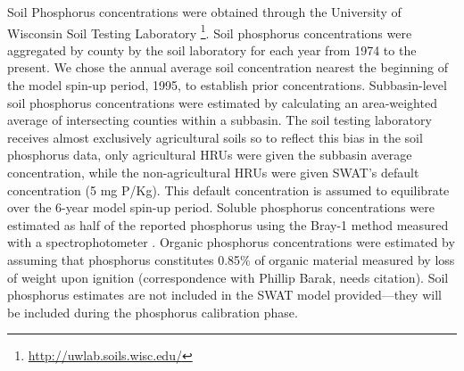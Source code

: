Soil Phosphorus concentrations were obtained through the University of Wisconsin
Soil Testing Laboratory \footnote{\url{http://uwlab.soils.wisc.edu/}}. Soil
phosphorus concentrations were aggregated by county by the soil laboratory for
each year from 1974 to the present. We chose the annual average soil
concentration nearest the beginning of the model spin-up period, 1995, to
establish prior concentrations. Subbasin-level soil phosphorus concentrations
were estimated by calculating an area-weighted average of intersecting counties
within a subbasin.
The soil testing laboratory receives almost exclusively agricultural soils so to reflect this bias in the soil phosphorus data, only agricultural HRUs were given the subbasin average concentration, while the non-agricultural HRUs were given SWAT's default concentration (5 mg P/Kg). This default concentration is assumed to equilibrate over the 6-year model spin-up period. 
Soluble phosphorus
concentrations were estimated as half of the reported phosphorus using the
Bray-1 method measured with a spectrophotometer \citep{vadas_validating_2010}.
Organic phosphorus concentrations were estimated by assuming that phosphorus
constitutes 0.85\% of organic material measured by loss of weight upon ignition
(correspondence with Phillip Barak, needs citation). Soil phosphorus estimates are not included in the SWAT model provided---they will be included during the phosphorus calibration phase.
